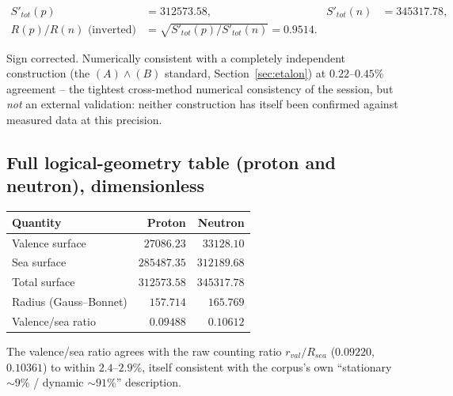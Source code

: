 \documentclass[11pt]{article}
\begin{document}
\begin{align}
S'_{tot}(p) &= 312573.58, & S'_{tot}(n) &= 345317.78,\\
R(p)/R(n) \text{ (inverted)} &= \sqrt{S'_{tot}(p)/S'_{tot}(n)} = 0.9514.
\end{align}

\begin{resultbox}
Sign corrected. Numerically consistent with a completely independent construction (the $(A)\wedge(B)$ standard, Section~\ref{sec:etalon}) at $0.22$--$0.45\%$ agreement -- the tightest cross-method numerical consistency of the session, but \emph{not} an external validation: neither construction has itself been confirmed against measured data at this precision.
\end{resultbox}

\subsection{Full logical-geometry table (proton and neutron), dimensionless}
\begin{center}
\begin{tabularx}{0.7\textwidth}{Yrr}
\toprule
Quantity & Proton & Neutron \\
\midrule
Valence surface & $27086.23$ & $33128.10$ \\
Sea surface & $285487.35$ & $312189.68$ \\
Total surface & $312573.58$ & $345317.78$ \\
Radius (Gauss--Bonnet) & $157.714$ & $165.769$ \\
Valence/sea ratio & $0.09488$ & $0.10612$ \\
\bottomrule
\end{tabularx}
\end{center}
The valence/sea ratio agrees with the raw counting ratio $r_{val}/R_{sea}$ ($0.09220$, $0.10361$) to within $2.4$--$2.9\%$, itself consistent with the corpus's own ``stationary $\sim9\%$ / dynamic $\sim91\%$'' description.
\end{document}
